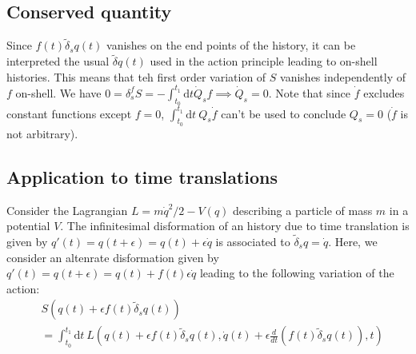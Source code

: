 \documentclass[12pt, a4paper]{article}
\begin{document}
\subsection{Conserved quantity}
Since $f(t)\tilde{\delta}_s q(t)$ vanishes on the end points of the history, it can be interpreted the usual $\tilde{\delta} q(t)$ used in the action principle leading to on-shell histories. This means that teh first order variation of $S$ vanishes independently of $f$ on-shell. We have $0 = \delta_s^f S = -\int_{t_0}^{t_1} \text{d}t \dot{Q}_s f \implies \dot{Q}_s = 0$. Note that since $\dot{f}$ excludes constant functions except $f=0$, $\int_{t_0}^{t_1} \text{d}t \  Q_s \dot{f}$ can't be used to conclude $Q_s = 0$ ($\dot{f}$ is not arbitrary). 
\subsection{Application to time translations}
Consider the Lagrangian $L= m \dot{q}^2/2 - V(q)$ describing a particle of mass $m$ in a potential $V$. The infinitesimal disformation of an history due to time translation is given by $q'(t) = q(t+\epsilon) =  q(t) + \epsilon\dot{q}$ is associated to $\tilde{\delta}_s q = \dot{q}$. Here, we consider an altenrate disformation given by  $q'(t) = q(t+\epsilon) =  q(t) + f(t)\epsilon\dot{q}$ leading to the following variation of the action:
\begin{align*}
    &S(q(t) +\epsilon f(t) \tilde{\delta}_s q(t))\\ &= \int_{t_0}^{t_1} \text{d}t \ L(q(t) +\epsilon f(t) \tilde{\delta}_s q(t), \dot{q}(t) +\epsilon \frac{d}{dt} (f(t) \tilde{\delta}_s q(t)), t)
\end{align*}


\makereferences


\end{document}
